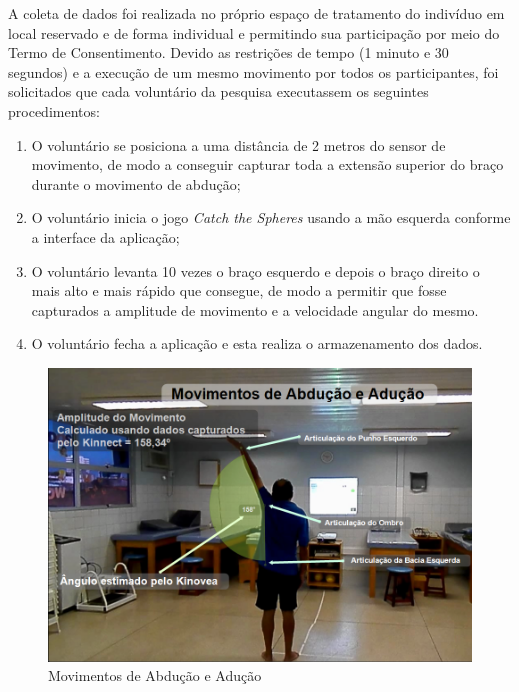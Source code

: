 A coleta de dados foi realizada no próprio espaço de tratamento do indivíduo em local reservado e de forma individual e permitindo sua participação por meio do Termo de Consentimento. Devido as restrições de tempo (1 minuto e 30 segundos) e a execução de um mesmo movimento por todos os participantes, foi solicitados que cada voluntário da pesquisa executassem os seguintes procedimentos:
\begin{enumerate}
	\item O voluntário se posiciona a uma distância de 2 metros do sensor de movimento, de modo a conseguir capturar toda a extensão superior do braço durante o movimento de abdução; 	
	\item O voluntário inicia o jogo \textit{Catch the Spheres} usando a mão esquerda conforme a interface da aplicação;
	\item O voluntário levanta 10 vezes o braço esquerdo e depois o braço direito o mais alto e mais rápido que consegue, de modo a permitir que fosse capturados a amplitude de movimento e a velocidade angular do mesmo. 
	\item O voluntário fecha a aplicação e esta realiza o armazenamento dos dados.
\end{enumerate}

\begin{figure}[!htbp]
 \centering
 \includegraphics[scale=0.5]{./img/capturaducaokinnect.png}
\caption{Movimentos de Abdução e Adução}
 \label{fig:movabducaomet}
\end{figure}

